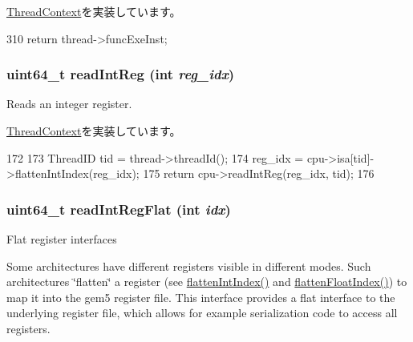 \hyperlink{classThreadContext_ae9aa32b63846c7bae5f2b6d899bdbf9c}{ThreadContext}を実装しています。


\begin{DoxyCode}
310 { return thread->funcExeInst; }
\end{DoxyCode}
\hypertarget{classInOrderThreadContext_a21c850cd41ab977a2cf3450fe66ec25a}{
\subsubsection[{readIntReg}]{\setlength{\rightskip}{0pt plus 5cm}uint64\_\-t readIntReg (int {\em reg\_\-idx})}}
\label{classInOrderThreadContext_a21c850cd41ab977a2cf3450fe66ec25a}
Reads an integer register. 

\hyperlink{classThreadContext_af80734776d68e6acd48e22f6c999394a}{ThreadContext}を実装しています。


\begin{DoxyCode}
172 {
173     ThreadID tid = thread->threadId();
174     reg_idx = cpu->isa[tid]->flattenIntIndex(reg_idx);
175     return cpu->readIntReg(reg_idx, tid);
176 }
\end{DoxyCode}
\hypertarget{classInOrderThreadContext_aed7abd4afcb954f8612e4ef1fe73317a}{
\subsubsection[{readIntRegFlat}]{\setlength{\rightskip}{0pt plus 5cm}uint64\_\-t readIntRegFlat (int {\em idx})}}
\label{classInOrderThreadContext_aed7abd4afcb954f8612e4ef1fe73317a}
Flat register interfaces

Some architectures have different registers visible in different modes. Such architectures \char`\"{}flatten\char`\"{} a register (see \hyperlink{classInOrderThreadContext_aa529f2d70520c578e3e29b3bf1a66312}{flattenIntIndex()} and \hyperlink{classInOrderThreadContext_ab9ea3f8f1a21df875c7273c7377dfac1}{flattenFloatIndex()}) to map it into the gem5 register file. This interface provides a flat interface to the underlying register file, which allows for example serialization code to access all registers. 

